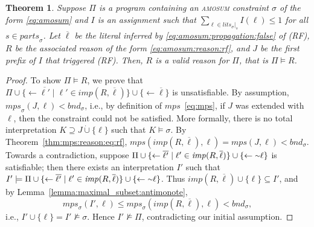 \documentclass[preprint,authoryear]{elsarticle}
\newcommand{\mps}{\mathit{mps}}
\newcommand{\bnd}{\mathit{bnd}}
\def\naf{\ensuremath{\raise.17ex\hbox{\ensuremath{\scriptstyle\mathtt{\sim}}}}\xspace}
\newtheorem{theorem}{Theorem}[section]
\theoremstyle{definition}
\def\naf{\ensuremath{\raise.17ex\hbox{\ensuremath{\scriptstyle\mathtt{\sim}}}}\xspace}
\begin{document}
\begin{theorem}
  Suppose $\Pi$ is a program containing an \textsc{amosum} constraint $\sigma$ of the form \eqref{eq:amosum}
    and $I$ is an assignment such that $\sum_{\ell \in \mathit{lits}_\sigma|_s}{I(\ell)} \leq 1$ for all $s \in \mathit{parts}_{\sigma} $. Let $\overline{\ell}$ be the literal inferred by \eqref{eq:amosum:propagation:false} of (RF), $R$ be the associated reason  of the form \eqref{eq:amosum:reason:rf}, and $J$ be the first prefix of $I$ that triggered (RF). 
    Then, $R$ is a valid reason for $\Pi$, that is $\Pi \models R$.
\end{theorem}

{\color{blue}
\begin{proof}
    To show $\Pi \models R$, we prove that $\Pi \cup \{\leftarrow \overline{\ell'} \mid \ell' \in \mathit{imp}(R,\overline{\ell})\} \cup \{\leftarrow \overline{\ell}\}$ is unsatisfiable.
    By assumption, $\mps_\sigma(J,\ell) < \bnd_\sigma$, i.e., by definition of $\mps$~\eqref{eq:mps}, if $J$ was extended with $\ell$, then the constraint could not be satisfied. More formally, there is no total interpretation $K\supseteq J\mathbin{\dot\cup}\{\ell\}$ such that $K\models\sigma$.
    By Theorem~\ref{thm:mps:reason:eq:rf}, $\mps(\mathit{imp}(R,\overline{\ell}),\ell) = \mps(J,\ell) < \bnd_\sigma$.
    Towards a contradiction, suppose $\Pi \cup \{\leftarrow \overline{\ell'} \mid \ell' \in \mathit{imp}(R,\overline{\ell})\} \cup \{\leftarrow \naf \ell\}$ is satisfiable; then there exists an interpretation $I'$ such that $I' \models \Pi \cup \{\leftarrow \overline{\ell'} \mid \ell' \in \mathit{imp}(R,\overline{\ell})\} \cup \{\leftarrow \naf\ell\}$.
    Thus $\mathit{imp}(R,\overline{\ell}) \cup \{\ell\} \subseteq I'$, and by Lemma~\ref{lemma:maximal_subset:antimonote},
    $$\mps_\sigma(I',\ell) \le \mps_\sigma(\mathit{imp}(R,\overline{\ell}),\ell) < \bnd_\sigma,$$
    i.e., $I' \cup \{\ell\} = I' \not\models \sigma$.
    Hence $I' \not\models \Pi$, contradicting our initial assumption.
\end{proof}
}
\end{document}
